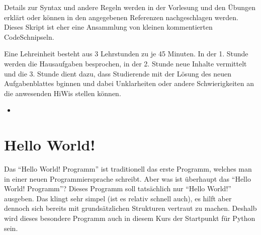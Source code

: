 \documentclass[letterpaper,10pt,english]{jupyterBook}
\begin{document}
\sphinxAtStartPar
{} Details zur Syntax und andere Regeln werden in der Vorlesung und den Übungen erklärt oder
können in den angegebenen Referenzen nachgeschlagen werden. Dieses Skript ist eher eine Ansammlung von kleinen kommentierten
Code\sphinxhyphen{}Schnipseln.

\begin{DUlineblock}{0em}
\item[] 
\end{DUlineblock}

\sphinxAtStartPar
Eine Lehreinheit besteht aus 3 Lehrstunden zu je 45 Minuten. In der 1. Stunde werden die Hausaufgaben besprochen, in der 2. Stunde
neue Inhalte vermittelt und die 3. Stunde dient dazu, dass Studierende mit der Lösung des neuen Aufgabenblattes bginnen und dabei
Unklarheiten oder andere Schwierigkeiten an die anwesenden HiWis stellen können.
\begin{itemize}
\item {} 
\sphinxAtStartPar
{\hyperref[\detokenize{Notebooks/HelloWorld::doc}]{}}

\end{itemize}

\sphinxstepscope


\chapter{Hello World!}
\label{\detokenize{Notebooks/HelloWorld:hello-world}}\label{\detokenize{Notebooks/HelloWorld::doc}}
\sphinxAtStartPar
Das “Hello World! \sphinxhyphen{} Programm” ist traditionell das erste Programm, welches man in einer neuen Programmiersprache schreibt.
Aber was ist überhaupt das “Hello World! \sphinxhyphen{} Programm”? Dieses Programm soll tatsächlich nur “Hello World!” ausgeben. Das klingt
sehr simpel (ist es relativ schnell auch), es hilft aber dennoch sich bereits mit grundsätzlichen Strukturen vertraut zu machen.
Deshalb wird dieses besondere Programm auch in diesem Kurs der Startpunkt für Python sein.
\end{document}

